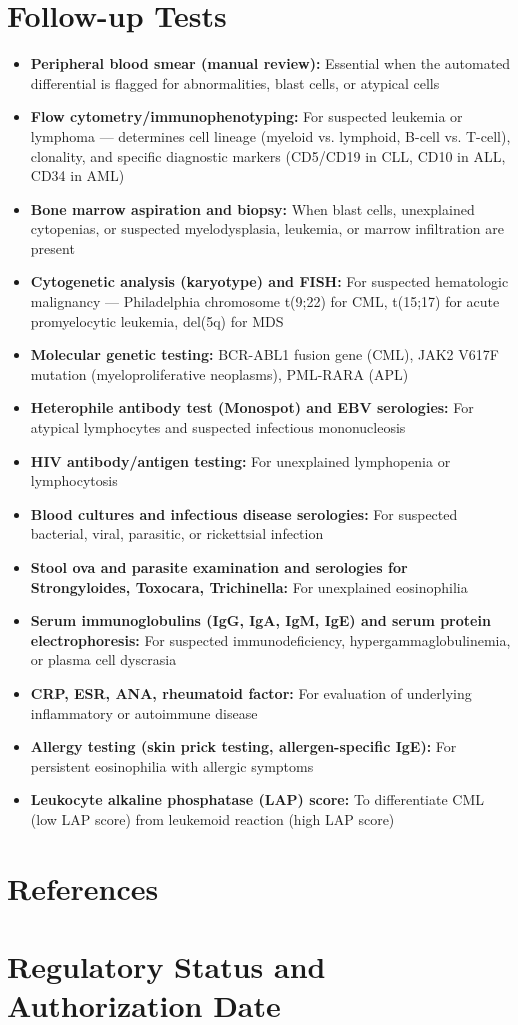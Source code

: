 \section*{Follow-up Tests}
\begin{itemize}
  \item \textbf{Peripheral blood smear (manual review):} Essential when the automated differential is flagged for abnormalities, blast cells, or atypical cells
  \item \textbf{Flow cytometry/immunophenotyping:} For suspected leukemia or lymphoma --- determines cell lineage (myeloid vs. lymphoid, B-cell vs. T-cell), clonality, and specific diagnostic markers (CD5/CD19 in CLL, CD10 in ALL, CD34 in AML)
  \item \textbf{Bone marrow aspiration and biopsy:} When blast cells, unexplained cytopenias, or suspected myelodysplasia, leukemia, or marrow infiltration are present
  \item \textbf{Cytogenetic analysis (karyotype) and FISH:} For suspected hematologic malignancy --- Philadelphia chromosome t(9;22) for CML, t(15;17) for acute promyelocytic leukemia, del(5q) for MDS
  \item \textbf{Molecular genetic testing:} BCR-ABL1 fusion gene (CML), JAK2 V617F mutation (myeloproliferative neoplasms), PML-RARA (APL)
  \item \textbf{Heterophile antibody test (Monospot) and EBV serologies:} For atypical lymphocytes and suspected infectious mononucleosis
  \item \textbf{HIV antibody/antigen testing:} For unexplained lymphopenia or lymphocytosis
  \item \textbf{Blood cultures and infectious disease serologies:} For suspected bacterial, viral, parasitic, or rickettsial infection
  \item \textbf{Stool ova and parasite examination and serologies for Strongyloides, Toxocara, Trichinella:} For unexplained eosinophilia
  \item \textbf{Serum immunoglobulins (IgG, IgA, IgM, IgE) and serum protein electrophoresis:} For suspected immunodeficiency, hypergammaglobulinemia, or plasma cell dyscrasia
  \item \textbf{CRP, ESR, ANA, rheumatoid factor:} For evaluation of underlying inflammatory or autoimmune disease
  \item \textbf{Allergy testing (skin prick testing, allergen-specific IgE):} For persistent eosinophilia with allergic symptoms
  \item \textbf{Leukocyte alkaline phosphatase (LAP) score:} To differentiate CML (low LAP score) from leukemoid reaction (high LAP score)
\end{itemize}

\section*{References}



\clearpage
\section*{Regulatory Status and Authorization Date}

\clearpage
